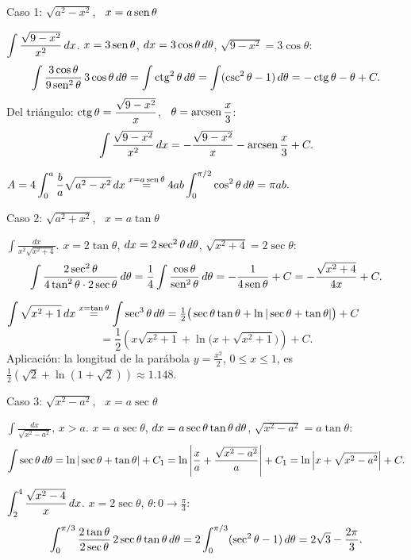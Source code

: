 \documentclass[10pt,aspectratio=169]{beamer}
\begin{document}
\begin{frame}{Caso 1: $\sqrt{a^2-x^2}$, \ $x=a\operatorname{sen}\theta$}
  \begin{ejemplo}[1]
    $\displaystyle\int\frac{\sqrt{9-x^2}}{x^2}\,dx$. \quad $x=3\operatorname{sen}\theta$, $dx=3\cos\theta\,d\theta$, $\sqrt{9-x^2}=3\cos\theta$:
    \[ \int\frac{3\cos\theta}{9\operatorname{sen}^2\theta}\,3\cos\theta\,d\theta=\int\operatorname{ctg}^2\theta\,d\theta=\int(\operatorname{csc}^2\theta-1)\,d\theta=-\operatorname{ctg}\theta-\theta+C. \]
    Del triángulo: $\operatorname{ctg}\theta=\dfrac{\sqrt{9-x^2}}{x}$, \ $\theta=\operatorname{arcsen}\dfrac x3$:
    \[ \int\frac{\sqrt{9-x^2}}{x^2}\,dx=-\frac{\sqrt{9-x^2}}{x}-\operatorname{arcsen}\frac x3+C. \]
  \end{ejemplo}
  \begin{ejemplo}
    $\displaystyle A=4\int_0^a\frac ba\sqrt{a^2-x^2}\,dx\overset{x=a\operatorname{sen}\theta}{=}4ab\int_0^{\pi/2}\cos^2\theta\,d\theta=\pi ab.$
  \end{ejemplo}
\end{frame}

\begin{frame}{Caso 2: $\sqrt{a^2+x^2}$, \ $x=a\tan\theta$}
  \begin{ejemplo}[3]
    $\displaystyle\int\frac{dx}{x^2\sqrt{x^2+4}}$. \quad $x=2\tan\theta$, $dx=2\sec^2\theta\,d\theta$, $\sqrt{x^2+4}=2\sec\theta$:
    \[ \int\frac{2\sec^2\theta}{4\tan^2\theta\cdot2\sec\theta}\,d\theta=\frac14\int\frac{\cos\theta}{\operatorname{sen}^2\theta}\,d\theta=-\frac{1}{4\operatorname{sen}\theta}+C
      =-\frac{\sqrt{x^2+4}}{4x}+C. \]
  \end{ejemplo}
  \begin{ejemplo}
    $\displaystyle\int\sqrt{x^2+1}\,dx\overset{x=\tan\theta}{=}\int\sec^3\theta\,d\theta=\tfrac12\big(\sec\theta\tan\theta+\ln|\sec\theta+\tan\theta|\big)+C$
    \[ =\frac12\left(x\sqrt{x^2+1}+\ln\big(x+\sqrt{x^2+1}\big)\right)+C. \]
    Aplicación: la longitud de la parábola $y=\frac{x^2}{2}$, $0\le x\le1$, es $\frac12\left(\sqrt2+\ln(1+\sqrt2)\right)\approx1.148$.
  \end{ejemplo}
\end{frame}

\begin{frame}{Caso 3: $\sqrt{x^2-a^2}$, \ $x=a\sec\theta$}
  \begin{ejemplo}[5]
    $\displaystyle\int\frac{dx}{\sqrt{x^2-a^2}}$, $x>a$. \quad $x=a\sec\theta$, $dx=a\sec\theta\tan\theta\,d\theta$, $\sqrt{x^2-a^2}=a\tan\theta$:
    \[ \int\sec\theta\,d\theta=\ln|\sec\theta+\tan\theta|+C_1=\ln\left|\frac xa+\frac{\sqrt{x^2-a^2}}{a}\right|+C_1
       =\ln\left|x+\sqrt{x^2-a^2}\right|+C. \]
  \end{ejemplo}
  \begin{ejemplo}[6]
    $\displaystyle\int_{2}^{4}\frac{\sqrt{x^2-4}}{x}\,dx$. \quad $x=2\sec\theta$, $\theta:0\to\frac\pi3$:
    \[ \int_0^{\pi/3}\frac{2\tan\theta}{2\sec\theta}\,2\sec\theta\tan\theta\,d\theta=2\int_0^{\pi/3}(\sec^2\theta-1)\,d\theta=2\sqrt3-\frac{2\pi}3. \]
  \end{ejemplo}
\end{frame}
\end{document}
